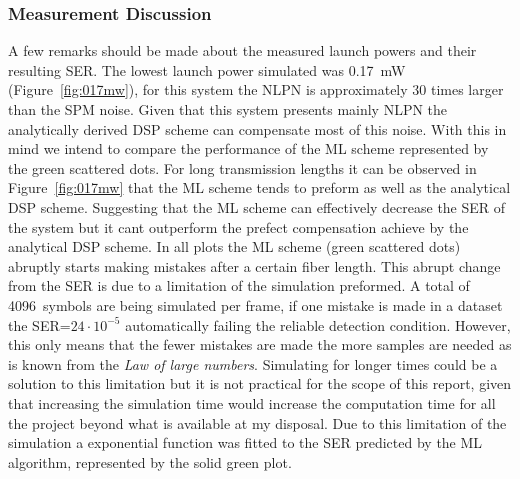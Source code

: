 \subsubsection{Measurement Discussion}

A few remarks should be made about the measured launch powers and their resulting SER. The lowest launch power simulated was 0.17~mW (Figure~\ref{fig:017mw}), for this system the NLPN is approximately 30 times larger than the SPM noise. Given that this system presents mainly NLPN the analytically derived DSP scheme can compensate most of this noise. With this in mind we intend to compare the performance of the ML scheme represented by the green scattered dots. For long transmission lengths it can be observed in Figure~\ref{fig:017mw} that the ML scheme tends to preform as well as the analytical DSP scheme. Suggesting that the ML scheme can effectively decrease the SER of the system but it cant outperform the prefect compensation achieve by the analytical DSP scheme. 
 In all plots the ML scheme (green scattered dots) abruptly starts making mistakes after a certain fiber length. This abrupt change from the SER is due to a limitation of the simulation preformed. A total of 4096~symbols are being simulated per frame, if one mistake is made in a dataset the SER=$24\cdot10^{-5}$ automatically failing the reliable detection condition. However, this only means that the fewer mistakes are made the more samples are needed as is known from the \textit{Law of large numbers}. Simulating for longer times could be a solution to this limitation but it is not practical for the scope of this report, given that increasing the simulation time would increase the computation time for all the project beyond what is available at my disposal.  
Due to this limitation of the simulation a exponential function was fitted to the SER predicted by the ML algorithm, represented by the solid green plot. 

